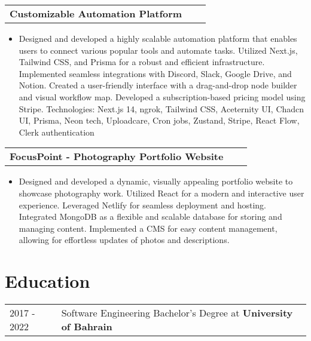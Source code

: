 \documentclass[a4paper,11pt]{article}
\makeatletter
\newenvironment{projectlong}[2]
    {
    \begin{tabularx}{\linewidth}{@{}l X r@{}}
    \textbf{#1} & \hfill &  #2 \\[3.75pt]
    \end{tabularx}
    \begin{minipage}[t]{\linewidth}
    \begin{itemize}[nosep,after=\strut, leftmargin=1em, itemsep=3pt,label=--]
    }
    {
    \end{itemize}
    \end{minipage}    
    }
\makeatother
\begin{document}
\begin{projectlong}{Customizable Automation Platform}{}
    \item Designed and developed a highly scalable automation platform that enables users to connect various popular tools and automate tasks.
            Utilized Next.js, Tailwind CSS, and Prisma for a robust and efficient infrastructure.
            Implemented seamless integrations with Discord, Slack, Google Drive, and Notion.
            Created a user-friendly interface with a drag-and-drop node builder and visual workflow map.
            Developed a subscription-based pricing model using Stripe.
            Technologies: Next.js 14, ngrok, Tailwind CSS, Aceternity UI, Chadcn UI, Prisma, Neon tech, Uploadcare, Cron jobs, Zustand, Stripe, React Flow, Clerk authentication
\end{projectlong}

\begin{projectlong}{FocusPoint - Photography Portfolio Website}{}
    \item Designed and developed a dynamic, visually appealing portfolio website to showcase photography work.
Utilized React for a modern and interactive user experience.
Leveraged Netlify for seamless deployment and hosting.
Integrated MongoDB as a flexible and scalable database for storing and managing content.
Implemented a CMS for easy content management, allowing for effortless updates of photos and descriptions.
\end{projectlong}




\section{Education}
\begin{tabularx}{\linewidth}{@{}l X@{}}	
2017 - 2022 & Software Engineering Bachelor's Degree at \textbf{University of Bahrain}  \\ 
\end{tabularx}

\end{document}
